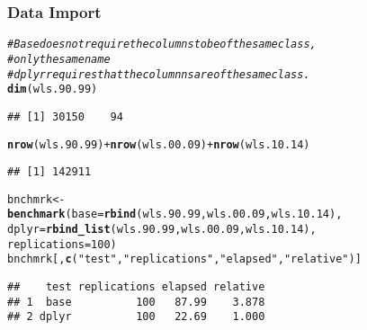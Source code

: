\documentclass{beamer}\usepackage[]{graphicx}\usepackage[]{color}
\makeatletter
\newcommand{\hlnum}[1]{\textcolor[rgb]{0.686,0.059,0.569}{#1}}%
\newcommand{\hlstr}[1]{\textcolor[rgb]{0.192,0.494,0.8}{#1}}%
\newcommand{\hlcom}[1]{\textcolor[rgb]{0.678,0.584,0.686}{\textit{#1}}}%
\newcommand{\hlopt}[1]{\textcolor[rgb]{0,0,0}{#1}}%
\newcommand{\hlstd}[1]{\textcolor[rgb]{0.345,0.345,0.345}{#1}}%
\newcommand{\hlkwb}[1]{\textcolor[rgb]{0.69,0.353,0.396}{#1}}%
\newcommand{\hlkwc}[1]{\textcolor[rgb]{0.333,0.667,0.333}{#1}}%
\newcommand{\hlkwd}[1]{\textcolor[rgb]{0.737,0.353,0.396}{\textbf{#1}}}%
\newenvironment{kframe}{%
 \def\at@end@of@kframe{}%
 \ifinner\ifhmode%
  \def\at@end@of@kframe{\end{minipage}}%
  \begin{minipage}{\columnwidth}%
 \fi\fi%
 \def\FrameCommand##1{\hskip\@totalleftmargin \hskip-\fboxsep
 \colorbox{shadecolor}{##1}\hskip-\fboxsep
     \hskip-\linewidth \hskip-\@totalleftmargin \hskip\columnwidth}%
 \MakeFramed {\advance\hsize-\width
   \@totalleftmargin\z@ \linewidth\hsize
   \@setminipage}}%
 {\par\unskip\endMakeFramed%
 \at@end@of@kframe}
\newenvironment{knitrout}{}{} %
\makeatother
\begin{document}
\begin{frame}[fragile]
  \frametitle{Data Import}
\begin{knitrout}\footnotesize
{}\color{fgcolor}\begin{kframe}
\begin{alltt}
\hlcom{# Base does not require the columns to be of the same class,}
\hlcom{# only the same name}
\hlcom{# dplyr requires that the columnns are of the same class.}
\hlkwd{dim}\hlstd{(wls.90.99)}
\end{alltt}
\begin{verbatim}
## [1] 30150    94
\end{verbatim}
\begin{alltt}
\hlkwd{nrow}\hlstd{(wls.90.99)} \hlopt{+} \hlkwd{nrow}\hlstd{(wls.00.09)} \hlopt{+} \hlkwd{nrow}\hlstd{(wls.10.14)}
\end{alltt}
\begin{verbatim}
## [1] 142911
\end{verbatim}
\begin{alltt}
\hlstd{bnchmrk} \hlkwb{<-}
  \hlkwd{benchmark}\hlstd{(}\hlkwc{base} \hlstd{=} \hlkwd{rbind}\hlstd{(wls.90.99, wls.00.09, wls.10.14),}
            \hlkwc{dplyr} \hlstd{=} \hlkwd{rbind_list}\hlstd{(wls.90.99, wls.00.09, wls.10.14),}
            \hlkwc{replications} \hlstd{=} \hlnum{100}\hlstd{)}
\hlstd{bnchmrk[,} \hlkwd{c}\hlstd{(}\hlstr{"test"}\hlstd{,} \hlstr{"replications"}\hlstd{,} \hlstr{"elapsed"}\hlstd{,} \hlstr{"relative"}\hlstd{)]}
\end{alltt}
\begin{verbatim}
##    test replications elapsed relative
## 1  base          100   87.99    3.878
## 2 dplyr          100   22.69    1.000
\end{verbatim}
\end{kframe}
\end{knitrout}
\end{frame} 
\end{document}
